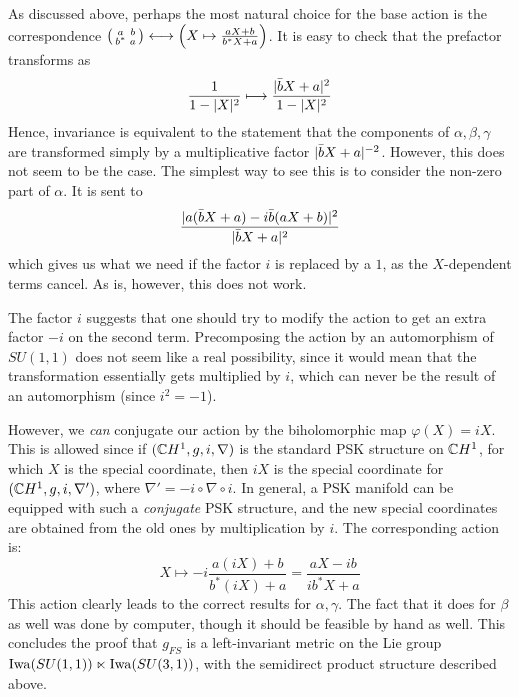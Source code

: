 \documentclass[parskip=half]{scrartcl}
\begin{document}
As discussed above, perhaps the most natural choice for the base action is the correspondence 
$\begin{psmallmatrix}
	a & b \\ b^* & a
\end{psmallmatrix} \longleftrightarrow
\Big(X\mapsto \frac{aX+b}{b^*X+a}\Big)$. It is easy to check that the prefactor transforms as
\begin{equation*}
	\frac{1}{1-\lvert X \rvert^2}\longmapsto \frac{\lvert \bar b X+a \rvert^2}{1-\lvert X \rvert^2}
\end{equation*}
Hence, invariance is equivalent to the statement that the components of $\alpha,\beta,\gamma$ are transformed simply by a multiplicative factor $\lvert \bar b X+a \rvert^{-2}$. However, this does not seem to be the case. The simplest way to see this is to consider the non-zero part of $\alpha$. It is sent to
	\begin{equation*}
		\frac{\lvert a(\bar b X+a)-i\bar b (a X+b) \rvert^2}{\lvert \bar b X+a \rvert^2}
	\end{equation*}
which gives us what we need if the factor $i$ is replaced by a $1$, as the $X$-dependent terms cancel. As is, however, this does not work. 

The factor $i$ suggests that one should try to modify the action to get an extra factor $-i$ on the second term. Precomposing the action by an automorphism of $SU(1,1)$ does not seem like a real possibility, since it would mean that the transformation essentially gets multiplied by $i$, which can never be the result of an automorphism (since $i^2=-1$). 

However, we \emph{can} conjugate our action by the biholomorphic map $\varphi(X)=iX$. This is allowed since if $(\mathbb{C} H^1,g,i,\nabla)$ is the standard PSK structure on $\mathbb{C} H^1$, for which $X$ is the special coordinate, then $iX$ is the special coordinate for $(\mathbb{C} H^1,g,i,\nabla')$, where $\nabla'=-i \circ\nabla \circ i$. In general, a PSK manifold can be equipped with such a \emph{conjugate} PSK structure, and the new special coordinates are obtained from the old ones by multiplication by $i$. The corresponding action is:
\begin{equation*}
	X\longmapsto -i\frac{a(iX)+b}{b^*(iX)+a}
	=\frac{aX-ib}{ib^*X+a}
\end{equation*}
This action clearly leads to the correct results for $\alpha,\gamma$. The fact that it does for $\beta$ as well was done by computer, though it should be feasible by hand as well. This concludes the proof that $g_{FS}$ is a left-invariant metric on the Lie group $\operatorname{Iwa}(SU(1,1))\ltimes \operatorname{Iwa}(SU(3,1))$, with the semidirect product structure described above.
\end{document}
